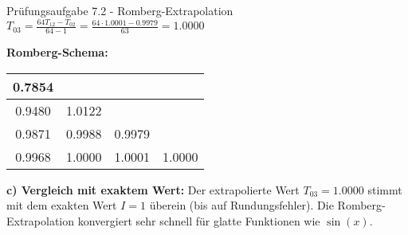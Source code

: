 \begin{example2}{Prüfungsaufgabe 7.2 - Romberg-Extrapolation}
$T_{03} = \frac{64T_{12} - T_{02}}{64 - 1} = \frac{64 \cdot 1.0001 - 0.9979}{63} = 1.0000$

\textbf{Romberg-Schema:}
\begin{center}
\begin{tabular}{|c|c|c|c|}
\hline
0.7854 & & & \\
\hline
0.9480 & 1.0122 & & \\
\hline
0.9871 & 0.9988 & 0.9979 & \\
\hline
0.9968 & 1.0000 & 1.0001 & 1.0000 \\
\hline
\end{tabular}
\end{center}

\textbf{c) Vergleich mit exaktem Wert:}
Der extrapolierte Wert $T_{03} = 1.0000$ stimmt mit dem exakten Wert $I = 1$ überein (bis auf Rundungsfehler). Die Romberg-Extrapolation konvergiert sehr schnell für glatte Funktionen wie $\sin(x)$.
\end{example2}

